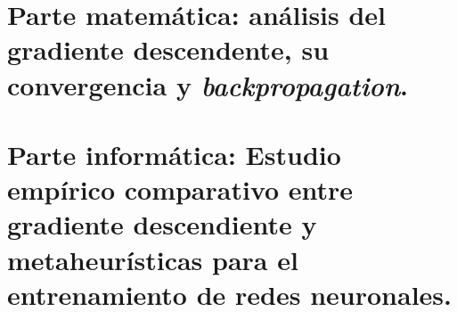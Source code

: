 ﻿\documentclass[a4paper,11pt]{article}
\begin{document}

%
\tableofcontents
\newpage
%
\setcounter{page}{1}
\setcounter{section}{0}
%


\newpage

\vspace{4cm}

\newpage 

\part{Parte matemática: análisis del gradiente descendente, su convergencia y \textit{backpropagation}.}

\newpage











\newpage

\part{Parte informática: Estudio empírico comparativo entre gradiente descendiente y metaheurísticas para el entrenamiento de redes neuronales.}

\vspace{4cm}

\newpage










\end{document}
